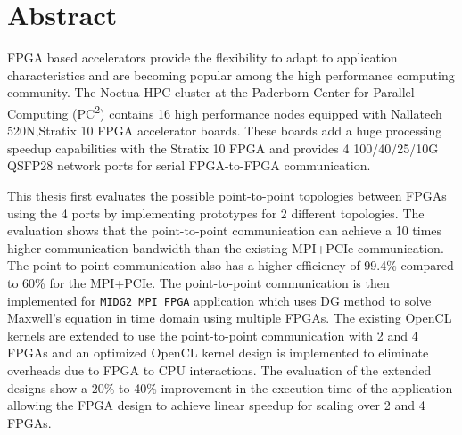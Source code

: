 \chapter{Abstract}

FPGA based accelerators provide the flexibility to adapt to application
characteristics and are becoming popular among the high performance computing
community. The Noctua HPC cluster at the Paderborn Center for Parallel
Computing (PC\textsuperscript{2}) contains 16 high performance nodes
equipped with Nallatech 520N,Stratix 10 FPGA accelerator boards.
These boards add a huge processing speedup capabilities with the Stratix 10
FPGA and provides 4 100/40/25/10G QSFP28 network ports for serial FPGA-to-FPGA
communication.

This thesis first evaluates the possible point-to-point topologies between
FPGAs using the 4 ports by implementing prototypes for 2 different topologies.
The evaluation shows that the point-to-point communication can achieve a 10
times higher communication bandwidth than the existing MPI+PCIe communication.
The point-to-point communication also has a higher efficiency of 99.4\% compared
to 60\% for the MPI+PCIe. The point-to-point communication is then implemented
for \texttt{MIDG2 MPI FPGA} application which uses \acl{DG} method to solve Maxwell’s equation
in time domain using multiple FPGAs. The existing OpenCL kernels are extended to
use the point-to-point communication with 2 and 4 FPGAs and an optimized OpenCL
kernel design is implemented to eliminate overheads due to FPGA to CPU interactions.
The evaluation of the extended designs show a 20\% to 40\% improvement in the
execution time of the application allowing the FPGA design to achieve linear speedup for
scaling over 2 and 4 FPGAs.